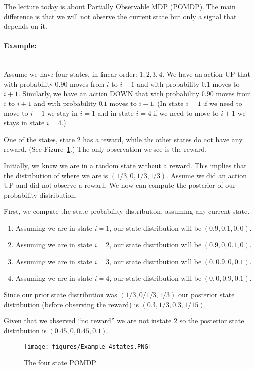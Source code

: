 
The lecture today is about Partially Observable MDP (POMDP). The
main difference is that we will not observe the current state but
only a signal that depends on it.


\paragraph{Example:}\ \\
Assume we have four states, in linear order: $1,2,3,4$. We have an
action UP that with probability $0.90$ moves from $i$ to $i-1$ and
with probability $0.1$ moves to $i+1$. Similarly, we have an action
DOWN that with probability $0.90$ moves from $i$ to $i+1$ and with
probability $0.1$ moves to $i-1$. (In state $i=1$ if we need to move
to $i-1$ we stay in $i=1$ and in state $i=4$ if we need to move to
$i+1$ we stays in state $i=4$.)

One of the states, state $2$ has a reward, while the other states do
not have any reward. (See Figure~\ref{fig:Example-4states}.) The
only observation we see is the reward.

Initially, we know we are in a random state without a reward. This
implies that the distribution of where we are is $(1/3,0,1/3,1/3)$.
Assume we did an action UP and did not observe a reward. We now can
compute the posterior of our probability distribution.

First, we compute the state probability distribution, assuming any
current state.
\begin{enumerate}
\item
Assuming we are in state $i=1$, our state distribution will be
$(0.9,0.1,0,0)$.
\item
Assuming we are in state $i=2$, our state distribution will be
$(0.9,0,0.1,0)$.
\item
Assuming we are in state $i=3$, our state distribution will be
$(0,0.9,0,0.1)$.
\item
Assuming we are in state $i=4$, our state distribution will be
$(0,0,0.9,0.1)$.
\end{enumerate}

Since our prior state distribution was $(1/3,0/1/3,1/3)$ our
posterior state distribution (before observing the reward) is
$(0.3,1/3,0.3,1/15)$.

Given that we observed ``no reward'' we are not instate $2$ so the
posterior state distribution is $(0.45,0,0.45,0.1)$.


\begin{figure}
  \begin{centering}
  \texttt{[image: figures/Example-4states.PNG]}\\
  \caption{The four state POMDP}\label{fig:Example-4states}
  \end{centering}
\end{figure}


